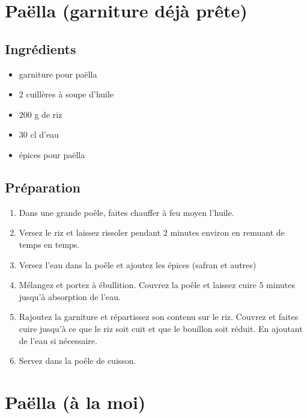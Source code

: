 \newpage
\section{Paëlla (garniture déjà prête)}
\subsection*{Ingrédients}
\begin{itemize}
\item garniture pour paëlla
\item 2 cuillères à soupe d'huile
\item $200$ g de riz
\item $30$ cl d'eau
\item épices pour paëlla
\end{itemize}

\subsection*{Préparation}
\begin{enumerate}
\item Dans une grande poêle, faites chauffer à feu moyen l'huile.
\item Versez le riz et laissez rissoler pendant 2 minutes environ en remuant de temps en temps.
\item Versez l'eau dans la poêle et ajoutez les épices (safran et autres)
\item Mélangez et portez à ébullition. Couvrez la poêle et laissez cuire 5 minutes jusqu'à absorption de l'eau.
\item Rajoutez la garniture et répartissez son contenu sur le riz. Couvrez et faites cuire jusqu'à ce que le riz soit cuit et que le bouillon soit réduit. En ajoutant de l'eau si nécessaire.
\item Servez dans la poêle de cuisson.
\end{enumerate}

\newpage
\section{Paëlla (à la moi)}
